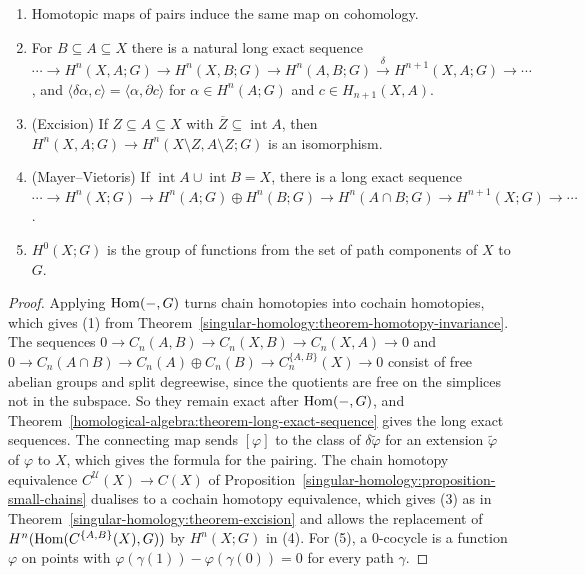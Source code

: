 \begin{theorem}\label{singular-cohomology:theorem-axioms}
\begin{enumerate}
\item Homotopic maps of pairs induce the same map on cohomology.
\item For $B \subseteq A \subseteq X$ there is a natural long exact sequence
$\cdots \to H^n(X, A; G) \to H^n(X, B; G) \to H^n(A, B; G) \xrightarrow{\delta} H^{n+1}(X, A; G) \to \cdots$, and
$\langle \delta\alpha, c \rangle = \langle \alpha, \partial c \rangle$ for $\alpha \in H^n(A; G)$ and $c \in H_{n+1}(X, A)$.
\item (Excision) If $Z \subseteq A \subseteq X$ with $\overline{Z} \subseteq \operatorname{int}A$, then $H^n(X, A; G) \to H^n(X \setminus Z, A \setminus Z; G)$ is an isomorphism.
\item (Mayer--Vietoris) If $\operatorname{int}A \cup \operatorname{int}B = X$, there is a long exact sequence
$\cdots \to H^n(X; G) \to H^n(A; G) \oplus H^n(B; G) \to H^n(A \cap B; G) \to H^{n+1}(X; G) \to \cdots$.
\item $H^0(X; G)$ is the group of functions from the set of path components of $X$ to $G$.
\end{enumerate}
\end{theorem}

\begin{proof}
Applying $\operatorname{Hom}(-, G)$ turns chain homotopies into cochain homotopies, which gives (1) from Theorem~\ref{singular-homology:theorem-homotopy-invariance}. The
sequences $0 \to C_n(A, B) \to C_n(X, B) \to C_n(X, A) \to 0$ and $0 \to C_n(A \cap B) \to C_n(A) \oplus C_n(B) \to C^{\{A, B\}}_n(X) \to 0$ consist of free abelian groups
and split degreewise, since the quotients are free on the simplices not in the subspace. So they remain exact after $\operatorname{Hom}(-, G)$, and
Theorem~\ref{homological-algebra:theorem-long-exact-sequence} gives the long exact sequences. The connecting map sends $[\varphi]$ to the class of $\delta\tilde\varphi$ for
an extension $\tilde\varphi$ of $\varphi$ to $X$, which gives the formula for the pairing. The chain homotopy equivalence $C^{\mathcal{U}}(X) \to C(X)$ of
Proposition~\ref{singular-homology:proposition-small-chains} dualises to a cochain homotopy equivalence, which gives (3) as in
Theorem~\ref{singular-homology:theorem-excision} and allows the replacement of $H^n(\operatorname{Hom}(C^{\{A,B\}}(X), G))$ by $H^n(X; G)$ in (4). For (5), a $0$-cocycle is a function
$\varphi$ on points with $\varphi(\gamma(1)) - \varphi(\gamma(0)) = 0$ for every path $\gamma$.
\end{proof}


